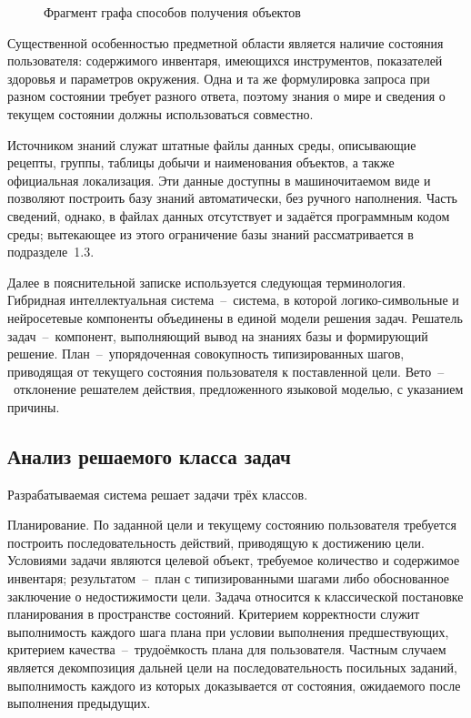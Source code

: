 \begin{figure}[!htb]
  \centering
  
  \caption{Фрагмент графа способов получения объектов}
  \label{fig:obtain_graph}
\end{figure}

{ Существенной особенностью предметной области является наличие состояния
пользователя: содержимого инвентаря, имеющихся инструментов, показателей здоровья
и параметров окружения. Одна и та же формулировка запроса при разном состоянии
требует разного ответа, поэтому знания о мире и сведения о текущем состоянии
должны использоваться совместно.\par}

Источником знаний служат штатные файлы данных среды, описывающие рецепты, группы,
таблицы добычи и наименования объектов, а также официальная локализация. Эти данные
доступны в машиночитаемом виде и позволяют построить базу знаний автоматически, без
ручного наполнения. Часть сведений, однако, в файлах данных отсутствует и задаётся
программным кодом среды; вытекающее из этого ограничение базы знаний рассматривается в
подразделе~1.3.

Далее в пояснительной записке используется следующая терминология. Гибридная
интеллектуальная система~--~система, в которой логико-символьные и нейросетевые
компоненты объединены в единой модели решения задач. Решатель задач~--~компонент,
выполняющий вывод на знаниях базы и формирующий решение. План~--~упорядоченная
совокупность типизированных шагов, приводящая от текущего состояния пользователя
к поставленной цели. Вето~--~отклонение решателем действия, предложенного языковой
моделью, с указанием причины.

\subsection{Анализ решаемого класса задач}

Разрабатываемая система решает задачи трёх классов.

Планирование. По заданной цели и текущему состоянию пользователя требуется
построить последовательность действий, приводящую к достижению цели. Условиями
задачи являются целевой объект, требуемое количество и содержимое инвентаря;
результатом~--~план с типизированными шагами либо обоснованное заключение о
недостижимости цели. Задача относится к классической постановке планирования в
пространстве состояний. Критерием корректности служит
выполнимость каждого шага плана при условии выполнения предшествующих, критерием
качества~--~трудоёмкость плана для пользователя. Частным случаем является
декомпозиция дальней цели на последовательность посильных заданий, выполнимость
каждого из которых доказывается от состояния, ожидаемого после выполнения
предыдущих\cite{Fikes1971,Ghallab2004}.

